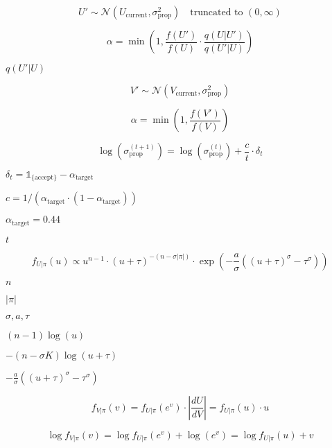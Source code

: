 \documentclass{article}
\begin{document}
\[U' \sim \mathcal{N}(U_{\text{current}}, \sigma_{\text{prop}}^2) \quad
\text{truncated to } (0, \infty) \]
\pagebreak

\[ \alpha = \min\left(1, \frac{f(U')}{f(U)} \cdot
\frac{q(U|U')}{q(U'|U)}\right) \]
\pagebreak

$q(U'|U)$
\pagebreak

\[V' \sim \mathcal{N}(V_{\text{current}}, \sigma_{\text{prop}}^2)
\]
\pagebreak

\[\alpha = \min\left(1, \frac{f(V')}{f(V)}\right)
\]
\pagebreak

\[\log(\sigma_{\text{prop}}^{(t+1)}) = \log(\sigma_{\text{prop}}^{(t)})
+ \frac{c}{t} \cdot \delta_t
\]
\pagebreak

$\delta_t = \mathbb{1}_{\{\text{accept}\}} - \alpha_{\text{target}}$
\pagebreak

$c = 1 / (\alpha_{\text{target}} \cdot (1 - \alpha_{\text{target}}))$
\pagebreak

$\alpha_{\text{target}} = 0.44$
\pagebreak

$t$
\pagebreak

\[f_{U|\pi}(u) \propto u^{n-1} \cdot (u + \tau)^{-(n-\sigma|\pi|)}
\cdot \exp\left(-\frac{a}{\sigma}\left((u+\tau)^\sigma -
\tau^\sigma\right)\right) \]
\pagebreak

$n$
\pagebreak

$|\pi|$
\pagebreak

$\sigma, a, \tau$
\pagebreak

$(n-1) \log(u)$
\pagebreak

$-(n - \sigma K) \log(u + \tau)$
\pagebreak

$-\frac{a}{\sigma}\left((u+\tau)^\sigma - \tau^\sigma\right)$
\pagebreak

\[f_{V|\pi}(v) = f_{U|\pi}(e^v) \cdot \left|\frac{dU}{dV}\right|
= f_{U|\pi}(u) \cdot u
\]
\pagebreak

\[\log f_{V|\pi}(v) = \log f_{U|\pi}(e^v) + \log(e^v) = \log f_{U|\pi}(u) + v
\]
\pagebreak
\end{document}
